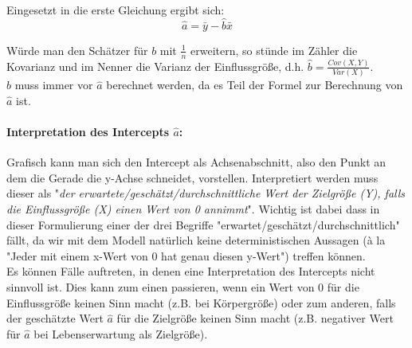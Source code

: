 \documentclass[a4paper]{article}
\newcommand\dangersign{%
 \makebox[1.8em][c]{%
 \makebox[0pt][c]{\raisebox{.15em}{\small!}}%
 \makebox[0pt][c]{\color{red}\Large$\triangle$}}}%
\begin{document}
\noindent Eingesetzt in die erste Gleichung ergibt sich:
$$\hat{a}=\bar{y}-\hat{b}\bar{x}$$

\noindent Würde man den Schätzer für $b$ mit $\frac{1}{n}$ erweitern, so stünde im Zähler die Kovarianz und im Nenner die Varianz der Einflussgröße, d.h. $\hat{b}=\frac{Cov(X,Y)}{Var(X)}$.\\

\noindent \dangersign $\hat b$ muss immer vor $\hat a$ berechnet werden, da es Teil der Formel zur Berechnung von $\hat a$ ist.

\paragraph{Interpretation des Intercepts $\hat a$:} Grafisch kann man sich den Intercept als Achsenabschnitt, also den Punkt an dem die Gerade die y-Achse schneidet, vorstellen. Interpretiert werden muss dieser als "\textit{der erwartete/geschätzt/durchschnittliche Wert der Zielgröße (Y), falls die Einflussgröße (X) einen Wert von 0 annimmt}". Wichtig ist dabei dass in dieser Formulierung einer der drei Begriffe "erwartet/geschätzt/durchschnittlich" fällt, da wir mit dem Modell natürlich keine deterministischen Aussagen (à la "Jeder mit einem x-Wert von 0 hat genau diesen y-Wert") treffen können.\\

\noindent \dangersign Es können Fälle auftreten, in denen eine Interpretation des Intercepts nicht sinnvoll ist. Dies kann zum einen passieren, wenn ein Wert von 0 für die Einflussgröße keinen Sinn macht (z.B. bei Körpergröße) oder zum anderen, falls der geschätzte Wert $\hat a$ für die Zielgröße keinen Sinn macht (z.B. negativer Wert für $\hat a$ bei Lebenserwartung als Zielgröße).
\end{document}
